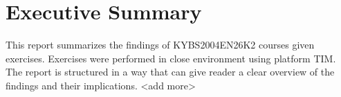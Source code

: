 \chapter{Executive Summary}
This report summarizes the findings of KYBS2004EN26K2 courses given exercises. Exercises were performed
in close environment using platform TIM. The report is structured in a way that can give reader 
a clear overview of the findings and their implications.
<add more>